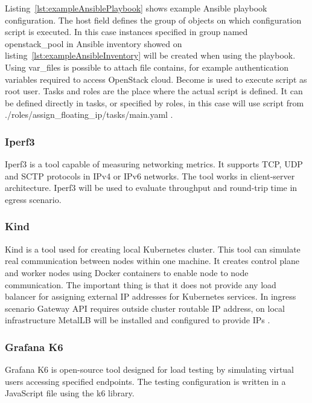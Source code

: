 Listing~\ref{lst:exampleAnsiblePlaybook} shows example Ansible playbook configuration. The host field defines the group of objects on which configuration script is executed. In this case instances specified in group named openstack\_pool in Ansible inventory showed on listing~\ref{lst:exampleAnsibleInventory} will be created when using the playbook. Using var\_files is possible to attach file contains, for example authentication variables required to access OpenStack cloud. Become is used to execute script as root user. Tasks and roles are the place where the actual script is defined. It can be defined directly in tasks, or specified by roles, in this case will use script from ./roles/assign\_floating\_ip/tasks/main.yaml \cite{AnsiblePlaybook}.


\subsubsection{Iperf3}
\label{sec:iperf3}

Iperf3 is a tool capable of measuring networking metrics. It supports TCP, UDP and SCTP protocols in IPv4 or IPv6 networks. The tool works in client-server architecture. Iperf3 will be used to evaluate throughput and round-trip time in egress scenario.

\subsubsection{Kind}
\label{sec:kind}

Kind is a tool used for creating local Kubernetes cluster. This tool can simulate real communication between nodes within one machine. It creates control plane and worker nodes using Docker containers to enable node to node communication. The important thing is that it does not provide any load balancer for assigning external IP addresses for Kubernetes services. In ingress scenario Gateway API requires outside cluster routable IP address, on local infrastructure MetalLB will be installed and configured to provide IPs \cite{Kind}.

\subsubsection{Grafana K6}
\label{sec:grafana}

Grafana K6 is open-source tool designed for load testing by simulating virtual users accessing specified endpoints. The testing configuration is written in a JavaScript file using the k6 library.

